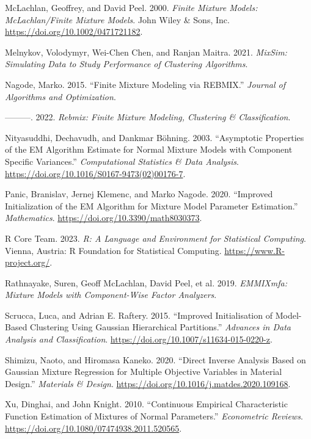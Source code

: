 \begin{CSLReferences}{1}{0}
\leavevmode{}%
McLachlan, Geoffrey, and David Peel. 2000. \emph{Finite {Mixture Models}: {McLachlan}/{Finite Mixture Models}}. John Wiley \& Sons, Inc. \url{https://doi.org/10.1002/0471721182}.

\leavevmode{}%
Melnykov, Volodymyr, Wei-Chen Chen, and Ranjan Maitra. 2021. \emph{MixSim: Simulating Data to Study Performance of Clustering Algorithms}.

\leavevmode{}%
Nagode, Marko. 2015. {``Finite Mixture Modeling via REBMIX.''} \emph{Journal of Algorithms and Optimization}.

\leavevmode{}%
---------. 2022. \emph{Rebmix: Finite Mixture Modeling, Clustering \& Classification}.

\leavevmode{}%
Nityasuddhi, Dechavudh, and Dankmar Böhning. 2003. {``Asymptotic Properties of the {EM} Algorithm Estimate for Normal Mixture Models with Component Specific Variances.''} \emph{Computational Statistics \& Data Analysis}. \url{https://doi.org/10.1016/S0167-9473(02)00176-7}.

\leavevmode{}%
Panic, Branislav, Jernej Klemenc, and Marko Nagode. 2020. {``Improved Initialization of the EM Algorithm for Mixture Model Parameter Estimation.''} \emph{Mathematics}. \url{https://doi.org/10.3390/math8030373}.

\leavevmode{}%
R Core Team. 2023. \emph{R: A Language and Environment for Statistical Computing}. Vienna, Austria: R Foundation for Statistical Computing. \url{https://www.R-project.org/}.

\leavevmode{}%
Rathnayake, Suren, Geoff McLachlan, David Peel, et al. 2019. \emph{EMMIXmfa: Mixture Models with Component-Wise Factor Analyzers}.

\leavevmode{}%
Scrucca, Luca, and Adrian E. Raftery. 2015. {``Improved Initialisation of Model-Based Clustering Using {Gaussian} Hierarchical Partitions.''} \emph{Advances in Data Analysis and Classification}. \url{https://doi.org/10.1007/s11634-015-0220-z}.

\leavevmode{}%
Shimizu, Naoto, and Hiromasa Kaneko. 2020. {``Direct Inverse Analysis Based on {Gaussian} Mixture Regression for Multiple Objective Variables in Material Design.''} \emph{Materials \& Design}. \url{https://doi.org/10.1016/j.matdes.2020.109168}.

\leavevmode{}%
Xu, Dinghai, and John Knight. 2010. {``Continuous {Empirical Characteristic Function Estimation} of {Mixtures} of {Normal Parameters}.''} \emph{Econometric Reviews}. \url{https://doi.org/10.1080/07474938.2011.520565}.

\end{CSLReferences}


